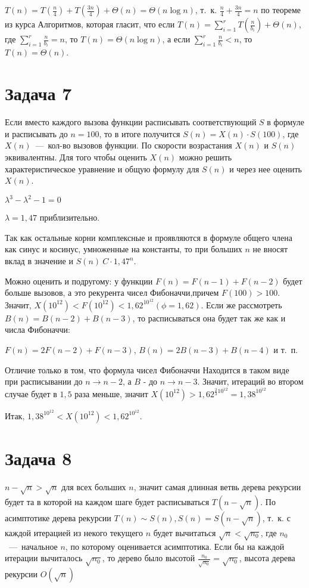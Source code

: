 \documentclass[a4paper,12pt]{article} %
\begin{document}
$T(n)=T(\frac{n}{4})+T(\frac{3n}{4})+\Theta(n)=\Theta(n\log{n})$, т.~к. $\frac{n}{4}+\frac{3n}{4}=n$ по теореме из курса Алгоритмов, которая гласит, что если $T(n)=\sum\limits_{i=1}^{r}T(\frac{n}{b_i})+\Theta(n)$, где $\sum\limits_{i=1}^{r}\frac{n}{b_i}=n$, то $T(n)=\Theta(n\log n)$, а если $\sum\limits_{i=1}^{r}\frac{n}{b_i}<n$, то $T(n)=\Theta(n)$.

\section{Задача 7}
\hspace{5mm}
Если вместо каждого вызова функции расписывать соответствующий $S$ в формуле и расписывать до $n=100$, то в итоге получится $S(n)=X(n)\cdot S(100)$, где $X(n)$~---~кол-во вызовов функции. По скорости возрастания $X(n)$ и $S(n)$ эквивалентны. Для того чтобы оценить $X(n)$ можно решить характеристическое уравнение и общую формулу для $S(n)$ и через нее оценить $X(n)$.

$\lambda^3-\lambda^2-1=0$

$\lambda=1,47$ приблизительно.

Так как остальные корни комплексные и проявляются в формуле общего члена как синус и косинус, умноженные на константы, то при больших $n$ не вносят вклад в значение и  $S(n)~C\cdot 1,47^n$. 

Можно оценить и подругому: у функции $F(n)=F(n-1)+F(n-2)$ будет больше вызовов, а это рекурента чисел Фибоначчи,причем $F(100)>100$. Значит, $X(10^{12})<F(10^{12})<1,62^{10^{12}}(\phi=1,62)$. Если же рассмотреть $B(n)=B(n-2)+B(n-3)$, то расписываться она будет так же как и числа Фибоначчи:

$F(n)=2F(n-2)+F(n-3)$, $B(n)=2B(n-3)+B(n-4)$ и т.~п. 

Отличие только в том, что формула чисел Фибоначчи Находится в таком виде при расписывании до $n\rightarrow n-2$, а $B$ - до $n \rightarrow n-3$. Значит, итераций во втором случае будет в $1,5$ раза меньше, значит $X(10^{12})>1,62^{\frac{2}{3}10^{12}}=1,38^{10^{12}}$

Итак, $1,38^{10^{12}}<X(10^{12})<1,62^{10^{12}}$.

\section{Задача 8}
\hspace{5mm}


$n-\sqrt{n}>\sqrt{n}$ для всех больших $n$, значит самая длинная ветвь дерева рекурсии будет та в которой на каждом шаге будет расписываться $T(n-\sqrt{n})$. По асимптотике дерева рекурсии $T(n)\sim S(n), S(n)=S(n-\sqrt{n})$, т.~к. с каждой итерацией из некого текущего $n$ будет вычитаться $\sqrt{n}<\sqrt{n_0}$, где $n_0$~---~начальное $n$, по которому оценивается асимптотика. Если бы на каждой итерации вычиталось $\sqrt{n_0}$, то дерево было высотой $\frac{n_0}{\sqrt{n_0}}=\sqrt{n_0}$, высота дерева рекурсии $O(\sqrt{n})$
\end{document}

